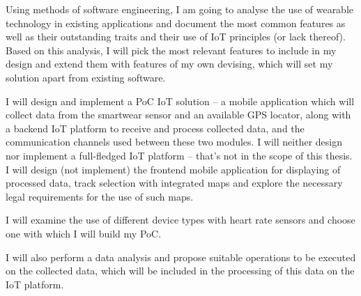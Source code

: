 Using methods of software engineering, I am going to analyse the use of wearable technology in existing applications and document the most common features as well as their outstanding traits and their use of IoT principles (or lack thereof).
Based on this analysis, I will pick the most relevant features to include in my design and extend them with features of my own devising, which will set my solution apart from existing software.

I will design and implement a PoC IoT solution -- a mobile application which will collect data from the smartwear sensor and an available GPS locator, along with a backend IoT platform to receive and process collected data, and the communication channels used between these two modules.
I will neither design nor implement a full-fledged IoT platform -- that's not in the scope of this thesis.
I will design (not implement) the frontend mobile application for displaying of processed data, track selection with integrated maps and explore the necessary legal requirements for the use of such maps.

I will examine the use of different device types with heart rate sensors and choose one with which I will build my PoC.

I will also perform a data analysis and propose suitable operations to be executed on the collected data, which will be included in the processing of this data on the IoT platform.
